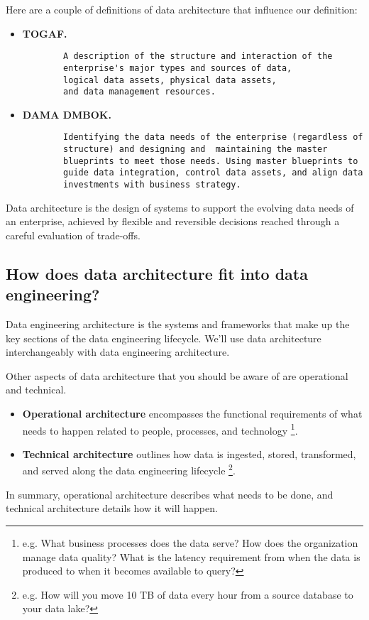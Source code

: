 Here are a couple of definitions of data architecture that influence
our definition:
\begin{itemize}
    \item \textbf{TOGAF.}
    
    \noindent
    \begin{verbatim}
        A description of the structure and interaction of the
        enterprise's major types and sources of data,
        logical data assets, physical data assets,
        and data management resources.
    \end{verbatim}


    \item \textbf{DAMA DMBOK.}
    
    \noindent
    \begin{verbatim}
        Identifying the data needs of the enterprise (regardless of
        structure) and designing and  maintaining the master
        blueprints to meet those needs. Using master blueprints to
        guide data integration, control data assets, and align data
        investments with business strategy.
    \end{verbatim}
\end{itemize}

Data architecture is the design of systems to support the evolving
data needs of an enterprise, achieved by flexible and reversible
decisions reached through a careful evaluation of trade-offs.



\subsection*{How does data architecture fit into data engineering?}
Data engineering architecture is the systems and frameworks
that make up the key sections of the data engineering lifecycle.
We'll use data architecture interchangeably with data engineering
architecture.

Other aspects of data architecture that you should be aware of are
operational and technical.
\begin{itemize}
    \item \textbf{Operational architecture} encompasses the functional
    requirements  of what needs to happen related to people, processes,
    and technology
    \footnote{
        e.g. What business processes does the data serve?
        How does the organization manage data quality?
        What is the latency requirement from when the data is
        produced to when it becomes available to query?
    }.

    \item \textbf{Technical architecture} outlines how data is
    ingested, stored, transformed, and served along the data
    engineering lifecycle
    \footnote{
        e.g. How will you move 10 TB of data every hour from a source
        database to your data lake?
    }.
\end{itemize}
In summary, operational architecture describes what needs to be done,
and technical architecture details how it will happen.



